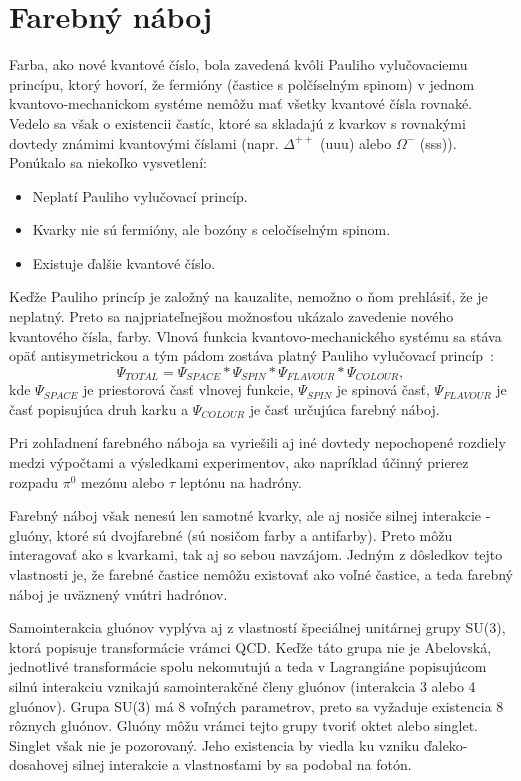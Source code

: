 \documentclass[thesismargins, thesislinespacing]{rnthesis}
\begin{document}
\section{Farebný náboj}
Farba, ako nové kvantové číslo, bola zavedená kvôli Pauliho vylučovaciemu princípu, ktorý hovorí, že fermióny (častice s polčíselným spinom) v jednom kvantovo-me\-cha\-nic\-kom systéme nemôžu mať všetky kvantové čísla rovnaké. Vedelo sa však o existencii častíc, ktoré sa skladajú z kvarkov s rovnakými dovtedy známimi kvantovými číslami (napr. $\Delta^{++}$ (uuu) alebo $\Omega^{-}$ (sss)). Ponúkalo sa niekoľko vysvetlení:
\begin{itemize}
	\item Neplatí Pauliho vylučovací princíp.
	\item Kvarky nie sú fermióny, ale bozóny s celočíselným spinom.
	\item Existuje ďalšie kvantové číslo.
\end{itemize}
Keďže Pauliho princíp je založný na kauzalite, nemožno o ňom prehlásiť, že je neplatný. Preto sa najpriateľnejšou možnosťou ukázalo zavedenie nového kvantového čísla, farby. Vlnová funkcia kvantovo-mechanického systému sa stáva opäť antisymetrickou a tým pádom zostáva platný Pauliho vylučovací princíp~\cite{1}:
\begin{equation}
	\Psi_{TOTAL}=\Psi_{SPACE}*\Psi_{SPIN}*\Psi_{FLAVOUR}*\Psi_{COLOUR}, 
\end{equation}   
kde $\Psi_{SPACE}$ je priestorová časť vlnovej funkcie, $\Psi_{SPIN}$ je spinová časť, $\Psi_{FLAVOUR}$ je časť popisujúca druh karku a $\Psi_{COLOUR}$ je časť určujúca farebný náboj.

Pri zohľadnení farebného náboja sa vyriešili aj iné dovtedy nepochopené rozdiely medzi výpočtami a výsledkami experimentov, ako napríklad účinný prierez rozpadu $\pi^0$ mezónu alebo $\tau$ leptónu na hadróny. 

Farebný náboj však nenesú len samotné kvarky, ale aj nosiče silnej interakcie - gluóny, ktoré sú dvojfarebné (sú nosičom farby a antifarby). Preto môžu interagovať ako s kvarkami, tak aj so sebou navzájom. Jedným z dôsledkov tejto vlastnosti je, že farebné častice nemôžu existovať ako voľné častice, a teda farebný náboj je uväznený vnútri hadrónov.

Samointerakcia gluónov vyplýva aj z vlastností špeciálnej unitárnej grupy SU(3), ktorá popisuje transformácie vrámci QCD. Keďže táto grupa nie je Abelovská, jednotlivé transformácie spolu nekomutujú a teda v Lagrangiáne popisujúcom silnú interakciu vznikajú samointerakčné členy gluónov (interakcia 3 alebo 4 gluónov). Grupa SU(3) má 8 voľných parametrov, preto sa vyžaduje existencia 8 rôznych gluónov. Gluóny môžu vrámci tejto grupy tvoriť oktet alebo singlet. Singlet však nie je pozorovaný. Jeho existencia by viedla ku vzniku ďaleko-dosahovej silnej interakcie a vlastnosťami by sa podobal na fotón. 
\end{document}
